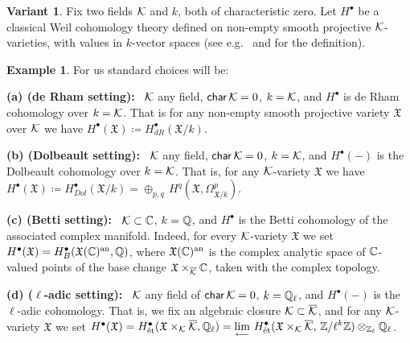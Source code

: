 \documentclass[twoside,leqno]{article}
\numberwithin{equation}{section}
\theoremstyle{plain}
\theoremstyle{definition}
\newtheorem{example}[equation]{Example}
\newtheorem{variant}[equation]{Variant}
\begin{document}
\begin{variant} \label{var-generalWeil} 
Fix two fields $\mathcal K$ and $k$, both of characteristic zero. Let $H^{\bullet}$ be a classical Weil cohomology theory  defined on non-empty smooth projective  $\mathcal K$-varieties, with values in $k$-vector spaces  (see e.g.\ \cite[Definition~1.2.13]{murre} and \cite[Section~45.7,tag~0FGS]{stacksproject} for the definition).

\begin{example} \label{ex:standardLkH}
For us standard choices will be:

\smallskip 

\noindent
{\bfseries (a) (de Rham setting):} \ $\mathcal K$ any field, $\mathsf{char} \, \mathcal K = 0$, $k = \mathcal K$, and $H^{\bullet}$ is de Rham cohomology over $k = \mathcal K$. That is for any non-empty smooth projective variety $\mathfrak{X}$ over $\mathcal K$ we have $H^{\bullet}(\mathfrak{X}) \coloneqq H^{\bullet}_{dR}(\mathfrak{X}/k)$.

\smallskip 

\noindent
{\bfseries (b) (Dolbeault setting):} \ $\mathcal K$ any field, $\mathsf{char} \, \mathcal K = 0$, $k = \mathcal K$, and $H^{\bullet}(-)$ is the Dolbeault  cohomology over $k = \mathcal K$. That is, for any $\mathcal K$-variety $\mathfrak{X}$ we have $H^{\bullet}(\mathfrak{X}) \coloneqq H^{\bullet}_{Dol}(\mathfrak{X}/k) = \oplus_{p,q} \, H^{q}(\mathfrak{X},\Omega^{p}_{\mathfrak{X}/k})$. 



\smallskip

\noindent
{\bfseries (c) (Betti setting):} \ $\mathcal K\subset \mathbb C$, $k = \mathbb Q$, and $H^{\bullet}$ is the Betti cohomology of the associated complex manifold. Indeed, for every $\mathcal K$-variety $\mathfrak{X}$ we set   
$H^{\bullet}(\mathfrak{X}) = H^{\bullet}_{B}(\mathfrak{X}(\mathbb C)^{\operatorname{an}},\mathbb Q)$, where $\mathfrak{X}(\mathbb C)^{\operatorname{an}}$ is the complex analytic space of $\mathbb C$-valued points of the base change $\mathfrak{X}\times_{\overline{\mathcal K}} \mathbb C$, taken with the complex topology. 

\smallskip

\noindent
{\bfseries (d) ($\ell$-adic setting):} \ $\mathcal K$ any field of $\mathsf{char}\, \mathcal K = 0$, $k = \mathbb Q_{\ell}$, and $H^{\bullet}(-)$ is the $\ell$-adic cohomology. That is, we fix an algebraic closure $\mathcal K \subset \overline{\mathcal K}$, and for any $\mathcal K$-variety $\mathfrak{X}$ we set $H^{\bullet}(\mathfrak{X}) = H^{\bullet}_{\text{\'{e}t}}(\mathfrak{X}\times_{\mathcal K} \overline{\mathcal K},\mathbb Q_{\ell}) = {\displaystyle \lim_{\substack{\longleftarrow}} \, H^{\bullet}_{\text{\'{e}t}}(\mathfrak{X}\times_{\mathcal K} \overline{\mathcal K},\, \mathbb Z/\ell^{k}\mathbb Z)\otimes_{\mathbb Z_{\ell}} \mathbb Q_{\ell}}$.
\end{example}


\end{variant}
\end{document}
